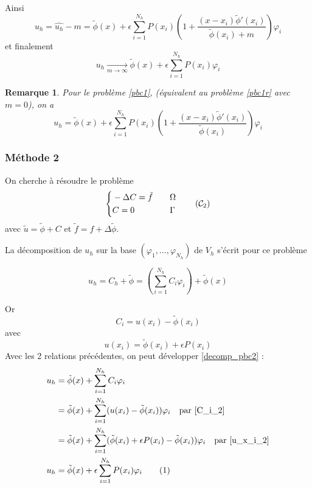 \documentclass[french]{article}
\newtheorem*{Rem}{Remarque}
\newcommand\numberthis{\addtocounter{equation}{1}\tag{\theequation}}
\begin{document}
	Ainsi
	$$u_h=\hat{u_h}-m=\tilde{\phi}(x)+\epsilon\sum_{i=1}^{N_h}P(x_i)\left(1+\frac{(x-x_i)\tilde{\phi}'(x_i)}{\tilde{\phi}(x_i)+m}\right)\varphi_i$$
	et finalement
	\begin{equation}
		u_h\xrightarrow[m\to\infty]{} \tilde{\phi}(x)+\epsilon\sum_{i=1}^{N_h}P(x_i)\varphi_i \label{result1}
	\end{equation}
	
	\begin{Rem}
		Pour le problème \ref{pbc1}, (équivalent au problème \ref{pbc1r} avec $m=0$), on a 
		$$u_h=\tilde{\phi}(x)+\epsilon\sum_{i=1}^{N_h}P(x_i)\left(1+\frac{(x-x_i)\tilde{\phi}'(x_i)}{\tilde{\phi}(x_i)}\right)\varphi_i$$
	\end{Rem}
	
	\subsubsection*{Méthode 2}
	
	On cherche à résoudre le problème
	\begin{equation}
		\left\{\begin{aligned}
			&-\Delta C=\tilde{f} \quad &&\Omega \\
			&C=0 \quad &&\Gamma
		\end{aligned}\right. \tag{$\mathcal{C}_2$}
	\end{equation}
	avec $\tilde{u}=\tilde{\phi}+C$ et $\tilde{f}=f+\Delta\tilde{\phi}$.
	
	La décomposition de $u_h$ sur la base $(\varphi_1,\dots,\varphi_{N_h})$ de $V_h$ s'écrit pour ce problème
	
	\begin{equation}
		u_h=C_h+\tilde{\phi}=\left(\sum_{i=1}^{N_h}C_i\varphi_i\right)+\tilde{\phi}(x) \label{decomp_pbc2}
	\end{equation}
	
	Or 
	\begin{equation}
		C_i=u(x_i)-\tilde{\phi}(x_i) \label{C_i_2}
	\end{equation}
	avec
	\begin{equation}
		u(x_i)=\tilde{\phi}(x_i)+\epsilon P(x_i) \label{u_x_i_2}
	\end{equation}
	Avec les 2 relations précédentes, on peut développer \ref{decomp_pbc2} :
	\begin{align*}
		u_h&=\tilde{\phi}(x)+\sum_{i=1}^{N_h}C_i\varphi_i \\
		&=\tilde{\phi}(x)+\sum_{i=1}^{N_h}(u(x_i)-\tilde{\phi}(x_i))\varphi_i \quad \text{par \ref{C_i_2}} \\
		&=\tilde{\phi}(x)+\sum_{i=1}^{N_h}(\tilde{\phi}(x_i)+\epsilon P(x_i)-\tilde{\phi}(x_i))\varphi_i \quad \text{par \ref{u_x_i_2}} \\
		u_h&=\tilde{\phi}(x)+\epsilon\sum_{i=1}^{N_h} P(x_i)\varphi_i \numberthis \label{result2}
	\end{align*}
	
\end{document}
